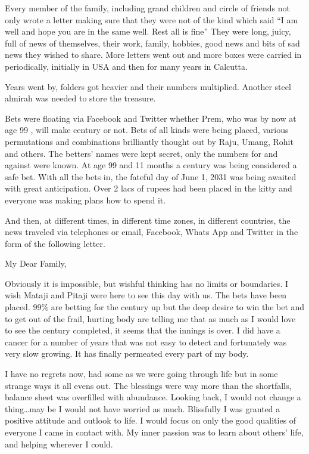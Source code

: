 Every member of the family, including grand children and circle of
friends not only wrote a letter making sure that they were not of the
kind which said ``I am well and hope you are in the same well. Rest all
is fine'' They were long, juicy, full of news of themselves, their work,
family, hobbies, good news and bits of sad news they wished to share.
More letters went out and more boxes were carried in periodically,
initially in USA and then for many years in Calcutta.

Years went by, folders got heavier and their numbers multiplied. Another
steel almirah was needed to store the treasure.

Bets were floating via Facebook and Twitter whether Prem, who was by now
at age 99 , will make century or not. Bets of all kinds were being
placed, various permutations and combinations brilliantly thought out by
Raju, Umang, Rohit and others. The betters' names were kept secret, only
the numbers for and against were known. At age 99 and 11 months a
century was being considered a safe bet. With all the bets in, the
fateful day of June 1, 2031 was being awaited with great anticipation.
Over 2 lacs of rupees had been placed in the kitty and everyone was
making plans how to spend it.

And then, at different times, in different time zones, in different
countries, the news traveled via telephones or email, Facebook, Whats
App and Twitter in the form of the following letter.

My Dear Family,

Obviously it is impossible, but wishful thinking has no limits or
boundaries. I wish Mataji and Pitaji were here to see this day with us.
The bets have been placed. 99\% are betting for the century up but the
deep desire to win the bet and to get out of the frail, hurting body are
telling me that as much as I would love to see the century completed, it
seems that the innings is over. I did have a cancer for a number of
years that was not easy to detect and fortunately was very slow growing.
It has finally permeated every part of my body.

I have no regrets now, had some as we were going through life but in
some strange ways it all evens out. The blessings were way more than the
shortfalls, balance sheet was overfilled with abundance. Looking back, I
would not change a thing\ldots{}may be I would not have worried as much.
Blissfully I was granted a positive attitude and outlook to life. I
would focus on only the good qualities of everyone I came in contact
with. My inner passion was to learn about others' life, and helping
wherever I could.

